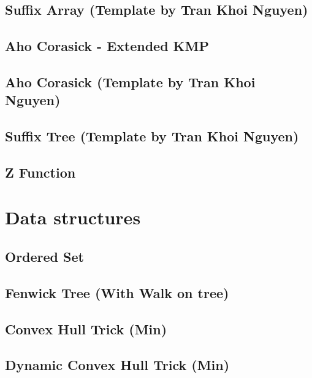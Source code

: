 \subsection{Suffix Array (Template by Tran Khoi Nguyen)}
\raggedbottom
\hrulefill
\subsection{Aho Corasick - Extended KMP}
\raggedbottom
\hrulefill
\subsection{Aho Corasick (Template by Tran Khoi Nguyen)}
\raggedbottom
\hrulefill
\subsection{Suffix Tree (Template by Tran Khoi Nguyen)}
\raggedbottom
\hrulefill
\subsection{Z Function}
\raggedbottom
\hrulefill

\section{Data structures}
\subsection{Ordered Set}
\raggedbottom
\hrulefill
\subsection{Fenwick Tree (With Walk on tree)}
\raggedbottom
\hrulefill
\subsection{Convex Hull Trick (Min)}
\raggedbottom
\hrulefill
\subsection{Dynamic Convex Hull Trick (Min)}
\raggedbottom
\hrulefill
